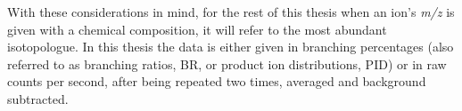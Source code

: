 With these considerations in mind, for the rest of this thesis when an ion's \textit{m/z} is given with a chemical composition, it will refer to the most abundant isotopologue.
In  this thesis  the data is either given in branching percentages (also referred to as branching ratios, BR, or product ion distributions, PID) 
or in raw counts per second, %
after being  repeated two times, averaged and background subtracted.




















